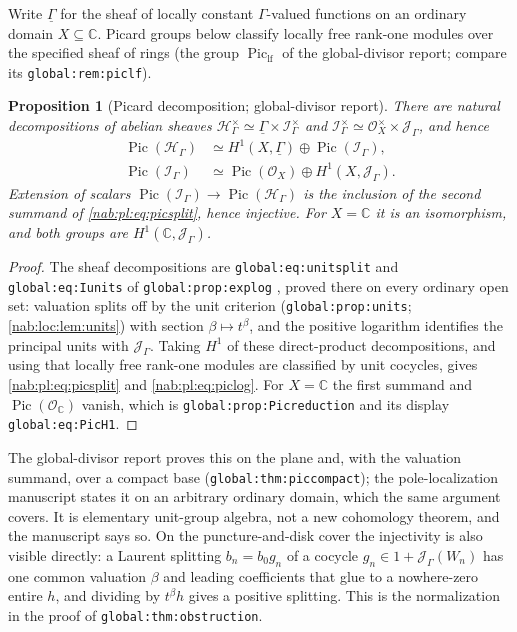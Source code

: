 \documentclass[11pt,letterpaper]{article}
\newtheorem{proposition}[proposition]{Proposition}
\theoremstyle{definition}
\theoremstyle{remark}
\newcommand{\C}{\mathbb C}
\newcommand{\OO}{\mathcal O}
\newcommand{\HH}{\mathscr H_\Gamma}
\newcommand{\II}{\mathscr I_\Gamma}
\newcommand{\JJ}{\mathscr J_\Gamma}
\newcommand{\Pic}{\operatorname{Pic}}
\numberwithin{equation}{section}
\begin{document}
Write $\underline\Gamma$ for the sheaf of locally constant $\Gamma$-valued
functions on an ordinary domain $X\subseteq\C$. Picard groups below classify
locally free rank-one modules over the specified sheaf of rings (the group
$\operatorname{Pic}_{\mathrm{lf}}$ of the global-divisor report; compare its
\nolinkurl{global:rem:piclf}).

\begin{proposition}[Picard decomposition; global-divisor report]
\label{nab:pl:prop:picard}
There are natural decompositions of abelian sheaves
$\HH^\times\simeq\underline\Gamma\times\II^\times$ and
$\II^\times\simeq\OO_X^\times\times\JJ$, and hence
\begin{align}
 \Pic(\HH)&\simeq H^1(X,\underline\Gamma)\oplus\Pic(\II),\label{nab:pl:eq:picsplit}\\
 \Pic(\II)&\simeq\Pic(\OO_X)\oplus H^1(X,\JJ).\label{nab:pl:eq:piclog}
\end{align}
Extension of scalars $\Pic(\II)\to\Pic(\HH)$ is the inclusion of the second
summand of \eqref{nab:pl:eq:picsplit}, hence injective. For $X=\C$ it is an
isomorphism, and both groups are $H^1(\C,\JJ)$.
\end{proposition}

\begin{proof}
The sheaf decompositions are \nolinkurl{global:eq:unitsplit} and
\nolinkurl{global:eq:Iunits} of \nolinkurl{global:prop:explog} \cite{RepoGlobal},
proved there on every ordinary open set: valuation splits off by the unit
criterion (\nolinkurl{global:prop:units}; \cref{nab:loc:lem:units}) with section
$\beta\mapsto t^\beta$, and the positive logarithm identifies the principal
units with $\JJ$. Taking $H^1$ of these direct-product decompositions, and
using that locally free rank-one modules are classified by unit cocycles,
gives \eqref{nab:pl:eq:picsplit} and \eqref{nab:pl:eq:piclog}. For $X=\C$ the
first summand and $\Pic(\OO_\C)$ vanish, which is
\nolinkurl{global:prop:Picreduction} and its display \nolinkurl{global:eq:PicH1}.
\end{proof}

The global-divisor report proves this on the plane and, with the valuation
summand, over a compact base (\nolinkurl{global:thm:piccompact}); the
pole-localization manuscript states it on an arbitrary ordinary domain, which
the same argument covers. It is elementary unit-group algebra, not a new
cohomology theorem, and the manuscript says so. On the puncture-and-disk cover
the injectivity is also visible directly: a Laurent splitting $b_n=b_0g_n$ of a
cocycle $g_n\in1+\JJ(W_n)$ has one common valuation $\beta$ and leading
coefficients that glue to a nowhere-zero entire $h$, and dividing by $t^\beta h$
gives a positive splitting. This is the normalization in the proof of
\nolinkurl{global:thm:obstruction}.
\end{document}
